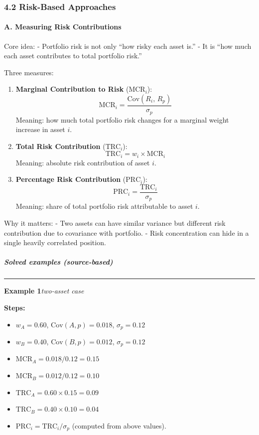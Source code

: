 \documentclass[
]{article}
\begin{document}
\hypertarget{risk-based-approaches}{%
\subsubsection{4.2 Risk-Based Approaches}\label{risk-based-approaches}}

\hypertarget{a.-measuring-risk-contributions}{%
\paragraph{A. Measuring Risk
Contributions}\label{a.-measuring-risk-contributions}}

Core idea: - Portfolio risk is not only ``how risky each asset is.'' -
It is ``how much each asset contributes to total portfolio risk.''

Three measures:
\begin{enumerate}
\item \textbf{Marginal Contribution to Risk} ($\text{MCR}_i$):
\[
\text{MCR}_i = \frac{\text{Cov}(R_i,\,R_p)}{\sigma_p}
\]
Meaning: how much total portfolio risk changes for a marginal weight increase in asset $i$.

\item \textbf{Total Risk Contribution} ($\text{TRC}_i$):
\[
\text{TRC}_i = w_i \times \text{MCR}_i
\]
Meaning: absolute risk contribution of asset $i$.

\item \textbf{Percentage Risk Contribution} ($\text{PRC}_i$):
\[
\text{PRC}_i = \frac{\text{TRC}_i}{\sigma_p}
\]
Meaning: share of total portfolio risk attributable to asset $i$.
\end{enumerate}

Why it matters: - Two assets can have similar variance but different
risk contribution due to covariance with portfolio. - Risk concentration
can hide in a single heavily correlated position.

\hypertarget{solved-examples-source-based}{%
\subparagraph{Solved examples
(source-based)}\label{solved-examples-source-based}}


\medskip
\noindent\rule{\linewidth}{0.4pt}
\noindent\textbf{Example 1}\enspace\textit{two-asset case}

\noindent\textbf{Steps:}
\begin{itemize}\setlength{\itemsep}{3pt}
  \item $w_A=0.60$,\; $\text{Cov}(A,p)=0.018$,\; $\sigma_p=0.12$
  \item $w_B=0.40$,\; $\text{Cov}(B,p)=0.012$,\; $\sigma_p=0.12$
  \item $\text{MCR}_A = 0.018/0.12 = 0.15$
  \item $\text{MCR}_B = 0.012/0.12 = 0.10$
  \item $\text{TRC}_A = 0.60 \times 0.15 = 0.09$
  \item $\text{TRC}_B = 0.40 \times 0.10 = 0.04$
  \item $\text{PRC}_i = \text{TRC}_i / \sigma_p$ (computed from above values).
\end{itemize}
\end{document}
